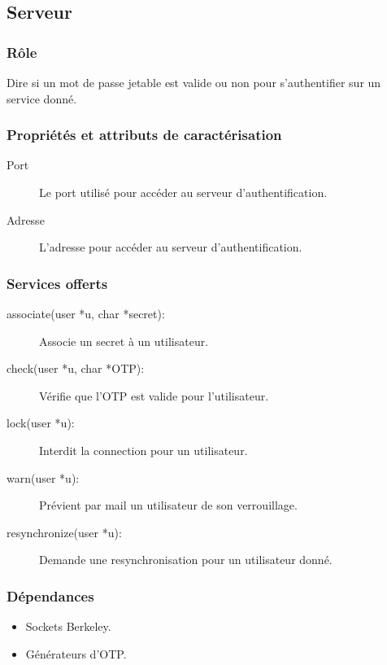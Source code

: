 \documentclass{"../../res/univ-projet"}
\begin{document}
\subsection{Serveur}
    \subsubsection{Rôle}
    Dire si un mot de passe jetable est valide ou non pour s'authentifier sur un
    service donné.

    \subsubsection{Propriétés et attributs de caractérisation}
    \begin{description}
        \item[Port] Le port utilisé pour accéder au serveur
            d'authentification.
        \item[Adresse] L'adresse pour accéder au serveur 
            d'authentification.
    \end{description}

    \subsubsection{Services offerts}
    \begin{description}
        \item[associate(user *u, char *secret):] Associe un secret à un 
            utilisateur.
        \item[check(user *u, char *OTP):] Vérifie que l'OTP est valide pour
            l'utilisateur.
        \item[lock(user *u):] Interdit la connection pour un utilisateur.
        \item[warn(user *u):] Prévient par mail un utilisateur de son 
            verrouillage.
        \item[resynchronize(user *u):] Demande une resynchronisation pour
            un utilisateur donné.
    \end{description}

    \subsubsection{Dépendances}
    \begin{itemize}
        \item Sockets Berkeley.
        \item Générateurs d'OTP.
    \end{itemize}
\end{document}
